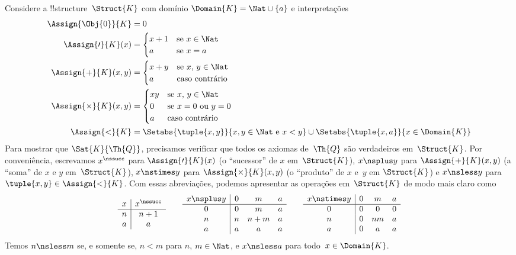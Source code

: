 \documentclass[../../../include/open-logic-section]{subfiles}
\begin{document}
\begin{ex}
Considere a !!{structure}~$\Struct{K}$ com domínio $\Domain{K} = \Nat
\cup \{a\}$ e interpretações
\begin{align*}
  \Assign{\Obj{0}}{K} & = 0\\
  \Assign{\prime}{K}(x) & =
  \begin{cases}
    x+1 & \text{se $x\in \Nat$}\\
    a & \text{se $x = a$}
  \end{cases}\\
  \Assign{+}{K}(x, y) & =
  \begin{cases}
    x+y & \text{se $x$, $y \in\Nat$}\\
    a & \text{caso contrário}
  \end{cases}\\
  \Assign{\times}{K}(x, y) & =
  \begin{cases}
    xy & \text{se $x$, $y \in\Nat$}\\
    0 & \text{se $x = 0$ ou $y = 0$}\\
    a & \text{caso contrário}\\
  \end{cases}\\
  \Assign{<}{K} & =
  \Setabs{\tuple{x,y}}{x, y \in \Nat \text{ e } x<y} \cup
  \Setabs{\tuple{x,a}}{x \in \Domain{K}}
\end{align*}
Para mostrar que $\Sat{K}{\Th{Q}}$, precisamos verificar que todos os
axiomas de~$\Th{Q}$ são verdadeiros em~$\Struct{K}$. Por conveniência,
escrevamos $x^\nssucc$ para $\Assign{\prime}{K}(x)$ (o ``sucessor'' de
$x$ em~$\Struct{K}$), $x \nsplus y$ para $\Assign{+}{K}(x, y)$ (a
``soma'' de $x$ e $y$ em~$\Struct{K}$), $x \nstimes y$ para
$\Assign{\times}{K}(x, y)$ (o ``produto'' de $x$ e~$y$ em
$\Struct{K}$) e $x \nsless y$ para $\tuple{x,y} \in \Assign{<}{K}$.
Com essas abreviações, podemos apresentar as operações em~$\Struct{K}$
de modo mais claro como
\[
\begin{array}{c|c}
  x & x^\nssucc \\
  \hline
  n & n+1 \\
  a & a
\end{array}
\qquad
\begin{array}{c|ccc}
  x \nsplus y & 0 & m & a \\
  \hline
  0 & 0 & m & a \\
  n & n & n+m & a \\
  a & a & a & a \\
\end{array}
\qquad
\begin{array}{c|ccc}
  x \nstimes y & 0 & m & a \\
  \hline
  0 & 0 & 0 & 0 \\
  n & 0 & nm & a \\
  a & 0 & a & a \\
\end{array}
\]
Temos $n \nsless m$ se, e somente se, $n<m$ para $n$, $m \in \Nat$, e
$x \nsless a$ para todo~$x \in \Domain{K}$.


\end{ex}
\end{document}
